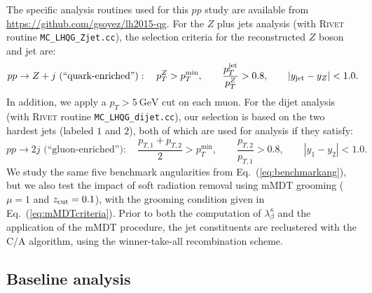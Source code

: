 \documentclass[11pt,letterpaper]{article}
\newcommand{\GeV}{\text{GeV}}
\DeclareRobustCommand{\Eq}[1]{Eq.~(\ref{#1})}
\newcommand{\be}{\begin{equation}}
\newcommand{\ee}{\end{equation}}
\begin{document}
The specific analysis routines used for this $pp$ study are available from \url{https://github.com/gsoyez/lh2015-qg}.  For the $Z$ plus jets analysis (with \textsc{Rivet} routine \verb|MC_LHQG_Zjet.cc|), the selection criteria for the reconstructed $Z$ boson and jet are:
\be
\text{$pp \to Z + j$ (``quark-enriched'')} : \quad p^{Z}_T  > p^\text{min}_T, \qquad \frac{p^\text{jet}_T}{p^{Z}_T} > 0.8, \qquad |y_{\rm jet} - y_Z| < 1.0.
\ee
In addition, we apply a $p_T > 5~\GeV$ cut on each muon.  For the dijet analysis (with \textsc{Rivet} routine \verb|MC_LHQG_dijet.cc|), our selection is based on the two hardest jets (labeled $1$ and $2$), both of which are used for analysis if they satisfy:
\be
\text{$pp \to 2j$ (``gluon-enriched'')} : \quad \frac{p_{T,1} + p_{T,2}}{2} > p^\text{min}_T, \qquad \frac{p_{T,2}}{p_{T,1}} > 0.8, \qquad |y_1 - y_2| < 1.0.
\ee 
We study the same five benchmark angularities from
\Eq{eq:benchmarkang}, but we also test the impact of soft radiation
removal using mMDT grooming ($\mu = 1$ and $z_{\rm cut} = 0.1$), with
the grooming condition given in \Eq{eq:mMDTcriteria}.
%
Prior to both the computation of $\lambda^{\kappa}_{\beta}$ and the application of the
mMDT procedure, the jet constituents are reclustered with the
C/A algorithm, using the winner-take-all recombination scheme.

\subsection{Baseline analysis}
\end{document}
